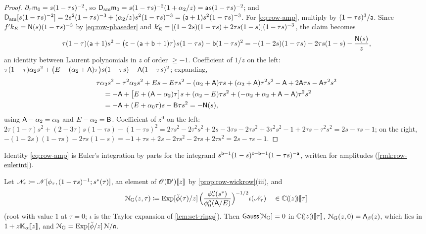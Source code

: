 \begin{proof}
$\partial_\tau\mathsf{m}_0=s(1-\tau s)^{-2}$, so $\mathsf{D}_{\mathrm{am}}\mathsf{m}_0=s(1-\tau s)^{-2}(1+\alpha_2/z)=\mathsf{a} s(1-\tau s)^{-2}$; and $\mathsf{D}_{\mathrm{am}}[s(1-\tau s)^{-2}]=2s^2(1-\tau s)^{-3}+(\alpha_2/z)s^2(1-\tau s)^{-3}=(\mathsf{a}+1)s^2(1-\tau s)^{-3}$. For \eqref{eq:row-amp}, multiply by $(1-\tau s)^3/\mathsf{a}$. Since $f'k_E=\mathsf{N}(s)(1-\tau s)^{-3}$ by \eqref{eq:row-phaseder} and $k_E'=[(1-2s)(1-\tau s)+2\tau s(1-s)](1-\tau s)^{-3}$, the claim becomes
\[
\tau(1-\tau)(\mathsf{a}+1)s^2+\big(\mathsf{c}-(\mathsf{a}+\mathsf{b}+1)\tau\big)s(1-\tau s)-\mathsf{b}(1-\tau s)^2=-(1-2s)(1-\tau s)-2\tau s(1-s)-\frac{\mathsf{N}(s)}{z},
\]
an identity between Laurent polynomials in $z$ of order $\geq-1$. Coefficient of $1/z$ on the left: $\tau(1-\tau)\alpha_2s^2+\big(E-(\alpha_2+\mathsf{A})\tau\big)s(1-\tau s)-\mathsf{A}(1-\tau s)^2$; expanding,
\begin{align*}
&\tau\alpha_2s^2-\tau^2\alpha_2s^2+Es-E\tau s^2-(\alpha_2+\mathsf{A})\tau s+(\alpha_2+\mathsf{A})\tau^2s^2-\mathsf{A}+2\mathsf{A}\tau s-\mathsf{A}\tau^2s^2\\
&\quad=-\mathsf{A}+\big[E+(\mathsf{A}-\alpha_2)\tau\big]s+(\alpha_2-E)\tau s^2+(-\alpha_2+\alpha_2+\mathsf{A}-\mathsf{A})\tau^2s^2\\
&\quad=-\mathsf{A}+(E+\alpha_0\tau)s-\mathsf{B}\tau s^2=-\mathsf{N}(s),
\end{align*}
using $\mathsf{A}-\alpha_2=\alpha_0$ and $E-\alpha_2=\mathsf{B}$. Coefficient of $z^0$ on the left: $2\tau(1-\tau)s^2+(2-3\tau)s(1-\tau s)-(1-\tau s)^2=2\tau s^2-2\tau^2s^2+2s-3\tau s-2\tau s^2+3\tau^2s^2-1+2\tau s-\tau^2s^2=2s-\tau s-1$; on the right, $-(1-2s)(1-\tau s)-2\tau s(1-s)=-1+\tau s+2s-2\tau s^2-2\tau s+2\tau s^2=2s-\tau s-1$.
\end{proof}

Identity \eqref{eq:row-amp} is Euler's integration by parts for the integrand $s^{\mathsf{b}-1}(1-s)^{\mathsf{c}-\mathsf{b}-1}(1-\tau s)^{-\mathsf{a}}$, written for amplitudes (\cref{rmk:row-eulerint}).

\begin{prop}
\label{prop:row-gaussode}
Let $\mathscr{N}_{\tau}\coloneqq\mathscr{N}[\phi_\tau,(1-\tau s)^{-1};s^{\ast}(\tau)]$, an element of $\mathscr{O}(\mathbb{D}')[\![ z ]\!]$ by \cref{prop:row-wickrow}(iii), and
\[
\mathcal{N}_{\mathrm{G}}(z,\tau)\coloneqq\mathrm{Exp}[\breve{\phi}(\tau)/z]\,\Big(\frac{\phi_\tau''(s^{\ast})}{\phi_0''(\mathsf{A}/E)}\Big)^{-1/2}\iota(\mathscr{N}_{\tau})\quad\in\mathbb{C}(\!(z)\!)[\![ \tau ]\!]
\]
(root with value $1$ at $\tau=0$; $\iota$ is the Taylor expansion of \cref{lem:set-rings}). Then $\mathsf{Gauss}[\mathcal{N}_{\mathrm{G}}]=0$ in $\mathbb{C}(\!(z)\!)[\![ \tau ]\!]$, $\mathcal{N}_{\mathrm{G}}(z,0)=\mathsf{A}_{\beta}(z)$, which lies in $1+z\mathbb{K}_{\alpha}[\![ z ]\!]$, and $\mathcal{N}_{\mathrm{G}}=\mathrm{Exp}[\breve{\phi}/z]\,\mathcal{N}/\mathfrak{a}$.
\end{prop}

